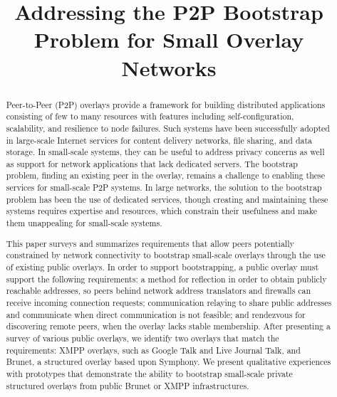 \documentclass[conference]{IEEEtran}
\begin{document}
\title{Addressing the P2P Bootstrap Problem for Small Overlay Networks}

\author{
}

\maketitle

\begin{abstract}

Peer-to-Peer (P2P) overlays provide a framework for building distributed
applications consisting of few to many resources with features including
self-configuration, scalability, and resilience to node failures.  Such systems
have been successfully adopted in large-scale Internet services for content
delivery networks, file sharing, and data storage.  In small-scale systems,
they can be useful to address privacy concerns as well as support for network
applications that lack dedicated servers.  The bootstrap problem, finding an
existing peer in the overlay, remains a challenge to enabling these services
for small-scale P2P systems.  In large networks, the solution to the bootstrap
problem has been the use of dedicated services, though creating and maintaining
these systems requires expertise and resources, which constrain their
usefulness and make them unappealing for small-scale systems.

This paper surveys and summarizes requirements that allow peers potentially
constrained by network connectivity to bootstrap small-scale overlays through
the use of existing public overlays.  In order to support bootstrapping, a
public overlay must support the following requirements: a method for reflection
in order to obtain publicly reachable addresses, so peers behind network
address translators and firewalls can receive incoming connection requests;
communication relaying to share public addresses and communicate when direct
communication is not feasible; and rendezvous for discovering remote peers,
when the overlay lacks stable membership.  After presenting a survey of various
public overlays, we identify two overlays that match the requirements:  XMPP
overlays, such as Google Talk and Live Journal Talk, and Brunet, a structured
overlay based upon Symphony.  We present qualitative experiences with
prototypes that demonstrate the ability to bootstrap small-scale private
structured overlays from public Brunet or XMPP infrastructures.

\end{abstract}
\end{document}
